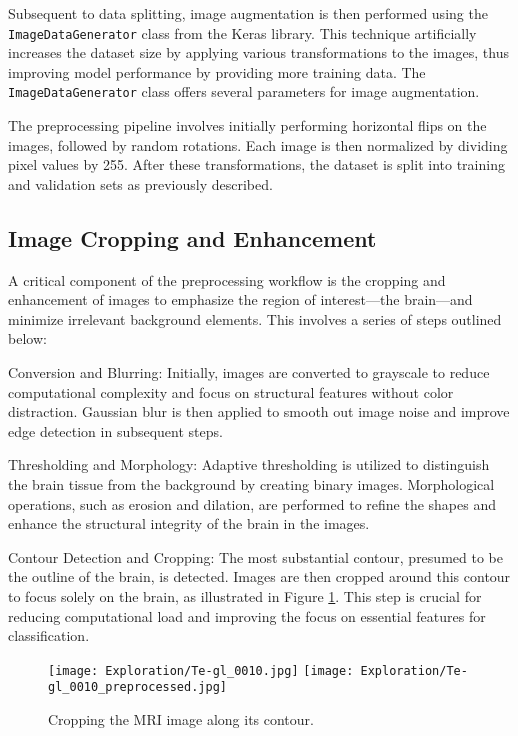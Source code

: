 Subsequent to data splitting, image augmentation is then performed using the \texttt{ImageDataGenerator} class from the Keras library. This technique artificially increases the dataset size by applying various transformations to the images, thus improving model performance by providing more training data. The \texttt{ImageDataGenerator} class offers several parameters for image augmentation.

The preprocessing pipeline involves initially performing horizontal flips on the images, followed by random rotations. Each image is then normalized by dividing pixel values by 255. After these transformations, the dataset is split into training and validation sets as previously described.

\subsection{Image Cropping and Enhancement}\label{image_cropping_enhancement}

A critical component of the preprocessing workflow is the cropping and enhancement of images to emphasize the region of interest—the brain—and minimize irrelevant background elements. This involves a series of steps outlined below:

Conversion and Blurring: Initially, images are converted to grayscale to reduce computational complexity and focus on structural features without color distraction. Gaussian blur is then applied to smooth out image noise and improve edge detection in subsequent steps.

Thresholding and Morphology: Adaptive thresholding is utilized to distinguish the brain tissue from the background by creating binary images. Morphological operations, such as erosion and dilation, are performed to refine the shapes and enhance the structural integrity of the brain in the images.

Contour Detection and Cropping: The most substantial contour, presumed to be the outline of the brain, is detected. Images are then cropped around this contour to focus solely on the brain, as illustrated in Figure \ref{fig:image_cropping}. This step is crucial for reducing computational load and improving the focus on essential features for classification.

\begin{figure}[H]
  \begin{center}
    \texttt{[image: Exploration/Te-gl\_0010.jpg]}
    \texttt{[image: Exploration/Te-gl\_0010\_preprocessed.jpg]}
  \end{center}
  \caption{Cropping the MRI image along its contour.}\label{fig:image_cropping}
\end{figure}

